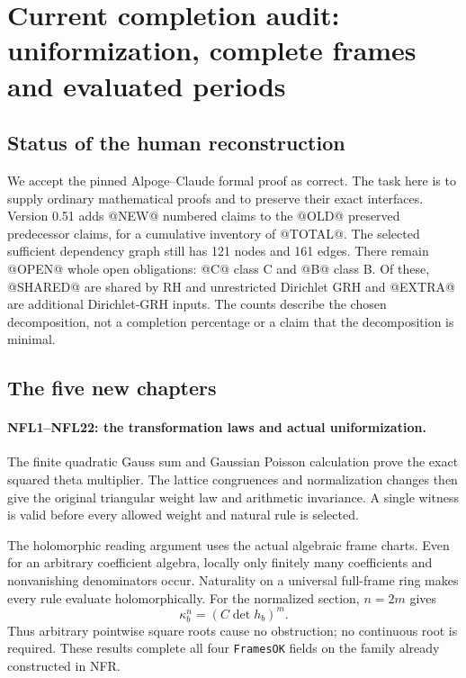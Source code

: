 \section{Current completion audit: uniformization, complete frames and evaluated periods}
\label{sec:dependency-audit-v51}

\subsection{Status of the human reconstruction}

We accept the pinned Alpoge--Claude formal proof as correct. The task
here is to supply ordinary mathematical proofs and to preserve their
exact interfaces. Version 0.51 adds @NEW@ numbered claims to the
@OLD@ preserved predecessor claims, for a cumulative inventory of
@TOTAL@. The selected sufficient dependency graph still has 121 nodes
and 161 edges. There remain @OPEN@ whole open obligations: @C@ class C
and @B@ class B. Of these, @SHARED@ are shared by RH and unrestricted
Dirichlet GRH and @EXTRA@ are additional Dirichlet-GRH inputs.
The counts describe the chosen decomposition, not a completion
percentage or a claim that the decomposition is minimal.

\subsection{The five new chapters}

\paragraph{NFL1--NFL22: the transformation laws and actual uniformization.}
The finite quadratic Gauss sum and Gaussian Poisson calculation prove
the exact squared theta multiplier. The lattice congruences and
normalization changes then give the original triangular weight law
and arithmetic invariance. A single witness is valid before every
allowed weight and natural rule is selected.

The holomorphic reading argument uses the actual algebraic frame
charts. Even for an arbitrary coefficient algebra, locally only
finitely many coefficients and nonvanishing denominators occur.
Naturality on a universal full-frame ring makes every rule evaluate
holomorphically. For the normalized section, $n=2m$ gives
\[
 \kappa_b^n=(C\det h_b)^m.
\]
Thus arbitrary pointwise square roots cause no obstruction; no
continuous root is required. These results complete all four
\texttt{FramesOK} fields on the family already constructed in NFR.


